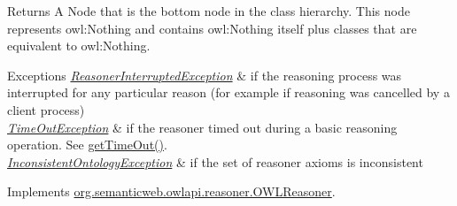 \begin{DoxyReturn}{Returns}
A {\ttfamily Node} that is the bottom node in the class hierarchy. This node represents {\ttfamily owl\-:Nothing} and contains {\ttfamily owl\-:Nothing} itself plus classes that are equivalent to {\ttfamily owl\-:Nothing}.
\end{DoxyReturn}

\begin{DoxyExceptions}{Exceptions}
{\em \hyperlink{classorg_1_1semanticweb_1_1owlapi_1_1reasoner_1_1_reasoner_interrupted_exception}{Reasoner\-Interrupted\-Exception}} & if the reasoning process was interrupted for any particular reason (for example if reasoning was cancelled by a client process) \\
\hline
{\em \hyperlink{classorg_1_1semanticweb_1_1owlapi_1_1reasoner_1_1_time_out_exception}{Time\-Out\-Exception}} & if the reasoner timed out during a basic reasoning operation. See \hyperlink{classorg_1_1semanticweb_1_1owlapi_1_1reasoner_1_1impl_1_1_o_w_l_reasoner_base_af55342eaaabb1b72dacfde7a181b93d2}{get\-Time\-Out()}. \\
\hline
{\em \hyperlink{classorg_1_1semanticweb_1_1owlapi_1_1reasoner_1_1_inconsistent_ontology_exception}{Inconsistent\-Ontology\-Exception}} & if the set of reasoner axioms is inconsistent \\
\hline
\end{DoxyExceptions}


Implements \hyperlink{interfaceorg_1_1semanticweb_1_1owlapi_1_1reasoner_1_1_o_w_l_reasoner_ae9ead4bfb1d306f15179d8642317706d}{org.\-semanticweb.\-owlapi.\-reasoner.\-O\-W\-L\-Reasoner}.

